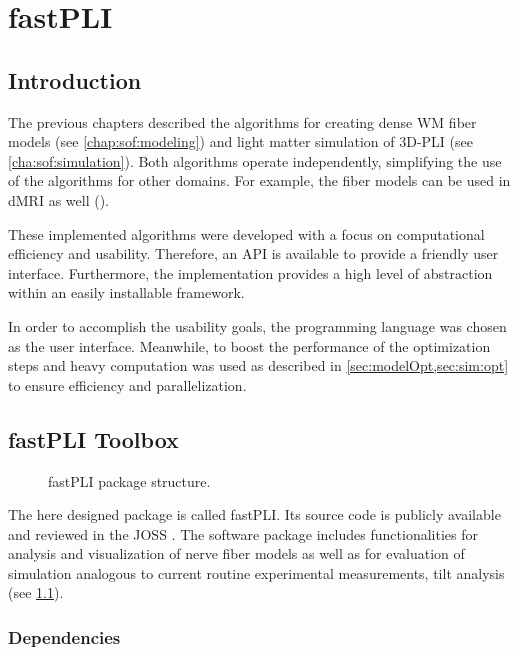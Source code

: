 \cleardoublepage
\setcounter{chapter}{6}
\chapter{\acs{fastPLI}}
\label{chap:Software}
% 
% 
% 
\section{Introduction}\label{sec:fastpliIntro}
%
The previous chapters described the algorithms for creating dense \ac{WM} fiber models (see \cref{chap:sof:modeling}) and light matter simulation of \ac{3D-PLI} (see \cref{cha:sof:simulation}).
Both algorithms operate independently, simplifying the use of the algorithms for other domains.
For example, the fiber models can be used in \ac{dMRI} as well (\cite{Ginsburger2019,ginsburgerDis2019}).

These implemented algorithms were developed with a focus on computational efficiency and usability.
Therefore, an \ac{API} is available to provide a friendly user interface.
Furthermore, the implementation provides a high level of abstraction within an easily installable framework. 
\par
%
In order to accomplish the usability goals, the \python{} programming language was chosen as the user interface.
Meanwhile, to boost the performance of the optimization steps and heavy computation \cpp{} was used as described in \cref{sec:modelOpt,sec:sim:opt} to ensure efficiency and parallelization.
%
% 
% 
\section{fastPLI Toolbox}
%
\begin{figure}[!ht]
\centering
{}
\caption{\acs{fastPLI} package structure.}
\label{fig:fastpli}
\end{figure}
%
The here designed \python{} package is called  \ac{fastPLI}.
Its source code is publicly available and reviewed in the  \ac{JOSS} \cite{fastpli,Matuschke2021}.
The software package includes functionalities for analysis and visualization of nerve fiber models as well as for evaluation of simulation analogous to current routine experimental measurements, \eg{} tilt analysis (see \cref{fig:fastpli}).
%
%
% 
\newpage
\subsection{Dependencies}
%
